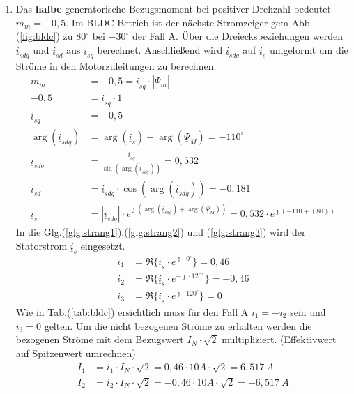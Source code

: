 \begin{solution}
\begin{enumerate}
\item Das \textbf{halbe} generatorische Bezugsmoment bei positiver Drehzahl bedeutet $m_m = -0,5$. Im BLDC Betrieb ist der n\"achste Stromzeiger gem Abb.(\ref{fig:bldc}) zu $80^\circ$ bei $-30^\circ$ der Fall A. \"Uber die Dreiecksbeziehungen werden $\underline{i}_{sdq}$ und $\underline{i}_{sd}$ aus $\underline{i}_{sq}$ berechnet. Anschließend wird $\underline{i}_{sdq}$ auf $\underline{i}_{s}$ umgeformt um die Str\"ome in den Motorzuleitungen zu berechnen.
\begin{align}
m_m &= -0,5 = \underline{i}_{sq} \cdot |\underline{\Psi_m}|\\
-0,5 &= \underline{i}_{sq} \cdot 1\\
\underline{i}_{sq} &= -0,5\\
\arg(\underline{i}_{sdq}) &= \arg(\underline{i}_{s}) -\arg(\underline{\Psi}_{M})=-110^\circ\\
\underline{i}_{sdq} &= \frac{\underline{i}_{sq}}{\sin(\arg(\underline{i}_{sdq}))}= 0,532\\
\underline{i}_{sd} &= \underline{i}_{sdq} \cdot \cos(\arg(\underline{i}_{sdq})) = -0,181\\
\underline{i}_{s} &= |\underline{i}_{sdq}| \cdot e^{\jmath (\arg(\underline{i}_{sdq}) + \arg(\underline{\Psi}_{M}))}= 0,532 \cdot e^{\jmath ( -110 + (80))}
\end{align}
In die Glg.(\ref{glg:strang1}),(\ref{glg:strang2}) und (\ref{glg:strang3}) wird der Statorstrom $\underline{i}_s$ eingesetzt.
\begin{align}
i_1 & = \Re \{ \underline{i}_s \cdot e^{\jmath \cdot 0 ^\circ} \} = 0,46\\
i_2 & = \Re \{ \underline{i}_s \cdot e^{-\jmath \cdot 120 ^\circ} \} = -0,46 \\
i_3 & = \Re \{ \underline{i}_s \cdot e^{\jmath \cdot 120 ^\circ} \}=  0
\end{align}
Wie in Tab.(\ref{tab:bldc}) ersichtlich muss f\"ur den Fall A $i_1= -i_2$ sein und $i_3= 0$ gelten.
Um die nicht bezogenen Ströme zu erhalten werden die bezogenen Ströme mit dem Bezugswert $I_N \cdot \sqrt{2}$ multipliziert. (Effektivwert auf Spitzenwert umrechnen)
\begin{align}
I_1 & = i_1 \cdot I_N \cdot \sqrt{2} = 0,46\cdot 10 A \cdot \sqrt{2} =6,517~A \\
I_2 & = i_2 \cdot I_N \cdot \sqrt{2} = -0,46 \cdot 10 A \cdot \sqrt{2} =-6,517~A \\

\end{align}
\end{enumerate}
\end{solution}
